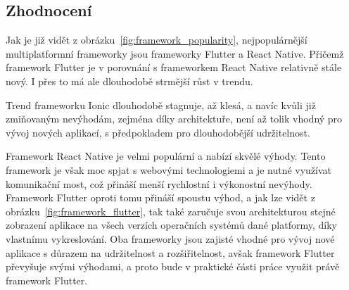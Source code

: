 \subsection{Zhodnocení}

Jak je již vidět z obrázku~\ref{fig:framework_popularity},
nejpopulárnější multiplatformní frameworky jsou frameworky Flutter a
React Native.
Přičemž framework Flutter je v porovnání s frameworkem React Native relativně
stále nový.
I přes to má ale dlouhodobě strmější růst v trendu.

Trend frameworku Ionic dlouhodobě stagnuje, až klesá,
a navíc kvůli již zmiňovaným nevýhodám,
zejména díky architektuře,
není až tolik vhodný pro vývoj nových aplikací,
s předpokladem pro dlouhodobější udržitelnost. 

Framework React Native je velmi populární a nabízí skvělé výhody.
Tento framework je však moc spjat s webovými technologiemi
a je nutné využívat komunikační most,
což přináší menší rychlostní i výkonostní nevýhody.
Framework Flutter oproti tomu přináší spoustu výhod,
a jak lze vidět z obrázku~\ref{fig:framework_flutter},
tak také zaručuje svou architekturou stejné zobrazení aplikace na všech
verzích operačních systémů dané platformy,
díky vlastnímu vykreslování.
Oba frameworky jsou zajisté vhodné pro vývoj nové aplikace s důrazem na
udržitelnost a rozšiřitelnost,
avšak framework Flutter převyšuje svými výhodami,
a proto bude v praktické části práce využit právě framework Flutter.
